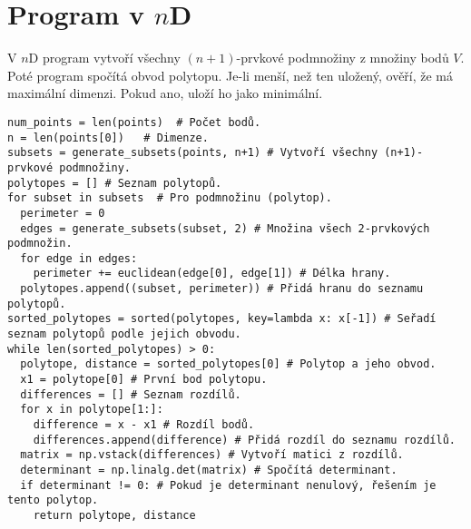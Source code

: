 \section{Program v \texorpdfstring{$n$D}{nD}}
\label{sec:program_nD}

V $n$D program vytvoří všechny $(n+1)$-prvkové podmnožiny z množiny bodů $V$. Poté program spočítá obvod polytopu. Je-li menší, než ten uložený, ověří, že má maximální dimenzi. Pokud ano, uloží ho jako minimální.

\begin{mdframed}[style=MyFrame]
\begin{lstlisting}[style=metoo]
num_points = len(points)  # Počet bodů.
n = len(points[0])   # Dimenze.
subsets = generate_subsets(points, n+1) # Vytvoří všechny (n+1)-prvkové podmnožiny.
polytopes = [] # Seznam polytopů.
for subset in subsets  # Pro podmnožinu (polytop).
  perimeter = 0
  edges = generate_subsets(subset, 2) # Množina všech 2-prvkových podmnožin.
  for edge in edges:
    perimeter += euclidean(edge[0], edge[1]) # Délka hrany.
  polytopes.append((subset, perimeter)) # Přidá hranu do seznamu polytopů.
sorted_polytopes = sorted(polytopes, key=lambda x: x[-1]) # Seřadí seznam polytopů podle jejich obvodu.
while len(sorted_polytopes) > 0:
  polytope, distance = sorted_polytopes[0] # Polytop a jeho obvod.
  x1 = polytope[0] # První bod polytopu.
  differences = [] # Seznam rozdílů.
  for x in polytope[1:]: 
    difference = x - x1 # Rozdíl bodů.
    differences.append(difference) # Přidá rozdíl do seznamu rozdílů.
  matrix = np.vstack(differences) # Vytvoří matici z rozdílů.
  determinant = np.linalg.det(matrix) # Spočítá determinant.
  if determinant != 0: # Pokud je determinant nenulový, řešením je tento polytop.
    return polytope, distance
\end{lstlisting}
\end{mdframed}